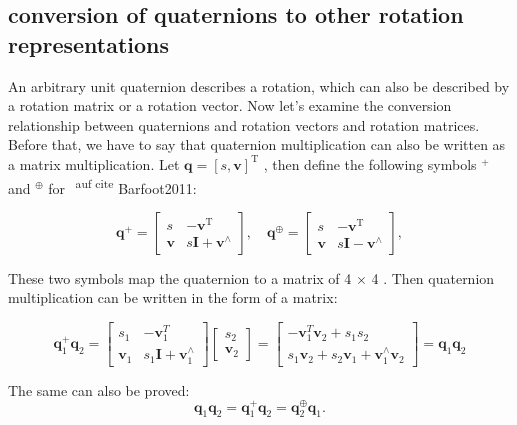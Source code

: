 \subsection{conversion of quaternions to other rotation representations}

An arbitrary unit quaternion describes a rotation, which can also be described by a rotation matrix or a rotation vector. Now let's examine the conversion relationship between quaternions and rotation vectors and rotation matrices. Before that, we have to say that quaternion multiplication can also be written as a matrix multiplication. Let $ \bm {q}=[s, \bm {v}]^ \mathrm {T} $ , then define the following symbols $ ^{+} $ and $ ^{ \oplus } $ for \textsuperscript { \ auf cite {}} Barfoot2011:

\begin{equation}
\bm{q}^{+}=\left[\begin{array}{cc}
s&-\bm{v}^\mathrm{T} \\
\bm{v}&s\bm{I}+\bm{v}^{\wedge}
\end{array}\right],\quad 
\bm{q}^{\oplus}=
\left[\begin{array}{cc}
s & -\bm{v}^\mathrm{T} \\
\bm{v} & s\bm{I}-\bm{v}^{\wedge}
\end{array}\right],
\end{equation}

These two symbols map the quaternion to a matrix of 4 $ \times $ 4 . Then quaternion multiplication can be written in the form of a matrix:

\begin{equation}
\bm{q}_1^ + {\bm{q}_2} = \left[ {\begin{array}{*{20}{c}}
	s_1&-\bm{v}_1^T\\
	\bm{v}_1 & s_1 \bm{I} + \bm{v}_1^\wedge
	\end{array}} \right]\left[ {\begin{array}{*{20}{c}}
	{{s _2}} \\
	{{ \bm {v} _2}}
	\end{array}} \right] = \left[ {\begin{array}{*{20}{c}}
	{- \bm{v} _1 ^ T { \bm{v} _2} + {s _1} {s _2}} \\ 
	{{s _1} { \bm{v} _2} + {s _2} { \bm{v} _1} + \bm{v} _1 ^ \wedge { \bm {v} _2}}
	\end{array}} \right] = \bm{q}_1 \bm{q}_2
\end{equation}

The same can also be proved:
\begin{equation}
\bm{q}_1 \bm{q}_2 = \bm{q}_1^{+} \bm{q}_2 = \bm{q}_2^{\oplus} \bm{q}_1.
\end{equation}

